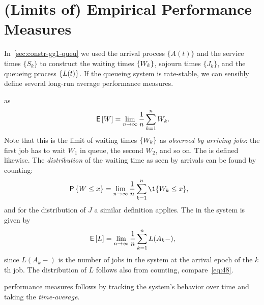 
\section{(Limits of) Empirical Performance Measures}
\label{sec:limits-of-empirical}

In~\cref{sec:constr-gg1-queu} we used the arrival process $\{A(t)\}$ and the service times $\{S_k\}$ to construct the waiting times $\{W_k\}$, sojourn times $\{J_k\}$, and the queueing process $\{L(t)\}$. If the queueing system is rate-stable, we can sensibly define several long-run average performance measures.




  as
\begin{equation*}
 \,\mathsf{E}\left[W\right] = \lim_{n\to\infty} \frac 1 n\sum_{k=1}^n W_{k}.
\end{equation*}
Note that this is the limit of waiting times $\{W_k\}$ as \emph{observed by arriving jobs}:
 the first job has to wait $W_1$ in queue, the second $W_2$, and so on.
The  is defined likewise.
The \emph{distribution} of the waiting time as seen by arrivals can be found by counting:
\begin{align}\label{eq:48}
 \P{\W \leq x} &= \lim_{n\to\infty} \frac 1n\sum_{k=1}^n \1{\W_k\leq x}, 
\end{align}
and for the distribution of $J$  a similar definition applies.
The  in the system is given by
\begin{equation}\label{eq:EQ}
\,\mathsf{E}\left[L\right] = \lim_{n\to\infty}\frac 1 n \sum_{k=1}^n L(A_k-),
\end{equation}
since $L(A_k-)$ is the number of jobs in the system at the arrival epoch of the $k$th job.
The distribution of $L$ follows also from counting, compare~\cref{eq:48}.


 performance measures follows by tracking the system's behavior over time and taking the \emph{time-average}.

